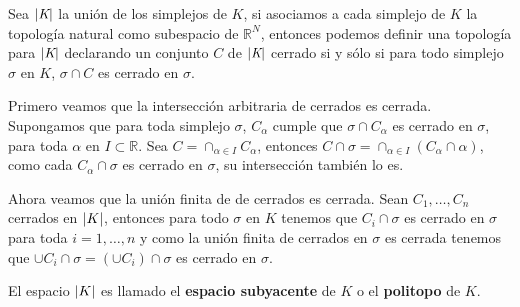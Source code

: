 \begin{Teo}
Sea $\left| \textit{K} \right|$ la unión de los simplejos de $\textit{K}$, si asociamos a cada simplejo de $\textit{K}$ la topología natural como subespacio de $\mathbb{R}^N$, entonces podemos definir una topología para $\left| \textit{K} \right|$ declarando  un conjunto $C$ de  $\left| \textit{K} \right|$ cerrado si y sólo si para todo simplejo $\sigma$ en  $\textit{K}$, $\sigma\cap C$ es cerrado en $\sigma$.
\end{Teo}
\begin{Dem}

Primero veamos que la intersección  arbitraria de cerrados es cerrada. Supongamos que para toda simplejo $\sigma$, $C_{\alpha}$ cumple que $\sigma\cap C_{\alpha}$ es cerrado en $\sigma$, para toda $\alpha$ en $I\subset \mathbb{R}$.
Sea $C = \cap_{\alpha \in I}C_{\alpha}$, entonces $C\cap\sigma = \cap_{\alpha\in I}(C_{\alpha}\cap\alpha)$, como cada $C_{\alpha}\cap \sigma$ es cerrado en $\sigma$, su intersección también lo es.

Ahora veamos que la unión finita de de cerrados es cerrada. Sean $C_1,\ldots,C_n$ cerrados en $\left| K \right|$, entonces para todo $\sigma$ en $K$ tenemos que $C_i \cap \sigma$ es cerrado en $\sigma$ para toda $i =1,\ldots,n$ y como la unión finita de cerrados en $\sigma$ es cerrada tenemos que $\cup C_i\cap\sigma = (\cup C_i)\cap\sigma$ es cerrado en $\sigma$.
\end{Dem}
El espacio $\left| K \right|$ es llamado el \textbf{espacio subyacente} de $K$ o el \textbf{politopo} de $K$.

